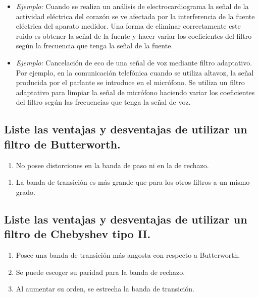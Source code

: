 \documentclass[a4paper,10pt,spanish,oneside]{article}
\begin{document}
\begin{enumerate}[a.]
\begin{itemize}
\item \textit{Ejemplo:} Cuando se realiza un análisis de electrocardiograma la señal de la actividad eléctrica del corazón se ve afectada por la interferencia de la fuente eléctrica del aparato medidor. Una forma de eliminar correctamente este ruido es obtener la señal de la fuente y hacer variar los coeficientes del filtro según la frecuencia que tenga la señal de la fuente.

\item \textit{Ejemplo:} Cancelación de eco de una señal de voz mediante filtro adaptativo. Por ejemplo, en la comunicación telefónica cuando se utiliza altavoz, la señal producida por el parlante se introduce en el micrófono. Se utiliza un filtro adaptativo para limpiar la señal de micrófono haciendo variar los coeficientes del filtro según las frecuencias que tenga la señal de voz.
\end{itemize} 

\end{enumerate}

\subsection{Liste las ventajas y desventajas de utilizar un filtro de Butterworth.}

\begin{enumerate}[(+)]
\item No posee distorciones en la banda de paso ni en la de rechazo.
\end{enumerate}

\begin{enumerate}[(-)]
\item La banda de transición es más grande que para los otros filtros a un mismo grado.
\end{enumerate}

\subsection{Liste las ventajas y desventajas de utilizar un filtro de Chebyshev tipo II.}

\begin{enumerate}[(+)]
\item Posee una banda de transición más angosta con respecto a Butterworth.
\item Se puede escoger su paridad para la banda de rechazo.
\item Al aumentar su orden, se estrecha la banda de transición.
\end{enumerate}
\end{document}
